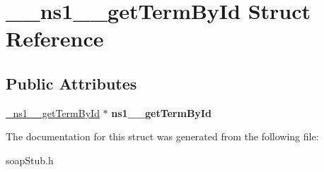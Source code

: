 \hypertarget{struct____ns1____getTermById}{
\section{\_\-\_\-ns1\_\-\_\-getTermById Struct Reference}
\label{struct____ns1____getTermById}
}
\subsection*{Public Attributes}
\begin{DoxyCompactItemize}
\item 
\hypertarget{struct____ns1____getTermById_a2923967666079ced42ec3190e987ac50}{
\hyperlink{class__ns1____getTermById}{\_\-ns1\_\-\_\-getTermById} $\ast$ {\bfseries ns1\_\-\_\-getTermById}}
\label{struct____ns1____getTermById_a2923967666079ced42ec3190e987ac50}

\end{DoxyCompactItemize}


The documentation for this struct was generated from the following file:\begin{DoxyCompactItemize}
\item 
soapStub.h\end{DoxyCompactItemize}
